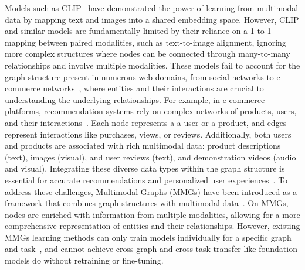 Models such as CLIP~\cite{radford2021learning} have demonstrated the power of learning from multimodal data by mapping text and images into a shared embedding space. 
However, CLIP and similar models are fundamentally limited by their reliance on a 1-to-1 mapping between paired modalities, such as text-to-image alignment, ignoring more complex structures where nodes can be connected through many-to-many relationships and involve multiple modalities. 
These models fail to account for the graph structure present in numerous web domains, from social networks to e-commerce networks~\cite{yoon2023multimodal,zhu2024multimodal,ektefaie2023multimodal}, where entities and their interactions are crucial to understanding the underlying relationships.
For example, in e-commerce platforms, recommendation systems rely on complex networks of products, users, and their interactions~\cite{schafer2001commerce}. 
Each node represents a a user or a product, and edges represent interactions like purchases, views, or reviews. 
Additionally, both users and products are associated with rich multimodal data: product descriptions (text), images (visual), and user reviews (text), and demonstration videos (audio and visual). 
Integrating these diverse data types within the graph structure is essential for accurate recommendations and personalized user experiences~\cite{gao2022graph}.
To address these challenges, Multimodal Graphs (MMGs) have been introduced as a framework that combines graph structures with multimodal data~\cite{zhu2024multimodal,ektefaie2023multimodal}. 
On MMGs, nodes are enriched with information from multiple modalities, allowing for a more comprehensive representation of entities and their relationships. 
However, existing MMGs learning methods can only train models individually for a specific graph and task~\cite{yoon2023multimodal,chen2022hybrid,zeng2023multi}, and cannot achieve cross-graph and cross-task transfer like foundation models do without retraining or fine-tuning.



